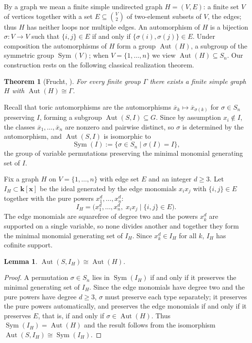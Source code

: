 \documentclass[11pt,letterpaper,reqno]{amsart}
\newtheorem{theorem}{Theorem}[section]
\newtheorem{lemma}[lemma]{Lemma}
\theoremstyle{remark}
\theoremstyle{definition}
\def\XX{\mathbf{x}}
\newcommand{\KK}[0]{\ensuremath{\mathbf{k}}}
\newcommand{\Aut}[0]{\ensuremath{\operatorname{Aut}}}
\newcommand{\Sym}[0]{\ensuremath{\operatorname{Sym}}}
\begin{document}
By a graph we mean a finite simple undirected graph $H=(V,E)$: a finite
set $V$ of vertices together with a set $E\subseteq\binom{V}{2}$ of
two-element subsets of $V$, the edges; thus $H$ has neither loops nor
multiple edges. An automorphism of $H$ is a bijection $\sigma\colon V\to
V$ such that $\{i,j\}\in E$ if and only if $\{\sigma(i),\sigma(j)\}\in E$. Under
composition the automorphisms of $H$ form a group $\Aut(H)$, a subgroup of the
symmetric group $\Sym(V)$; when $V=\{1,\dots,n\}$ we view $\Aut(H)\subseteq S_n$.
Our construction rests on the following classical realization theorem.

\begin{theorem}[Frucht, {\cite[Sections~2--3]{Frucht1939}}]\label{thm:frucht}
For every finite group $\Gamma$ there exists a finite simple graph $H$ with
$\Aut(H)\cong\Gamma$.
\end{theorem}


Recall that toric automorphisms are the
automorphisms $\overline{x}_k\mapsto\overline{x}_{\sigma(k)}$ for $\sigma\in S_n$
preserving $I$, forming a subgroup $\Aut(S,I)\subseteq G$. Since by assumption $x_i\not\in I$, the classes $\overline{x}_1,\dots,\overline{x}_n$ are nonzero and pairwise distinct, so $\sigma$ is determined by the automorphism, and $\Aut(S,I)$ is isomorphic to
$$\Sym(I):=\{\sigma\in S_n\mid\sigma(I)=I\},$$
the group of variable permutations preserving the minimal monomial generating set of $I$.

Fix a graph $H$ on $V=\{1,\dots,n\}$ with edge set $E$ and an integer
$d\geq 3$. Let $I_H\subset\KK[\XX]$ be the ideal generated by the
edge monomials $x_ix_j$ with $\{i,j\}\in E$ together with the pure powers
$x_1^d,\dots,x_n^d$:
\begin{equation}\label{eq:IH}
I_H=\big(x_1^d,\dots,x_n^d,\;x_ix_j\mid\{i,j\}\in E\big).
\end{equation}
The edge monomials are squarefree of degree two and the powers
$x_k^d$ are supported on a single variable, so none divides another and
together they form the minimal monomial generating set of $I_H$. Since $x_k^d\in I_H$ for all $k$, $I_H$
has cofinite support.

\begin{lemma}\label{lem:frucht-ideal}
$\Aut(S,I_H)\cong\Aut(H)$.
\end{lemma}

\begin{proof}
A permutation $\sigma\in S_n$ lies in $\Sym(I_H)$ if and only if it preserves
the minimal generating set of $I_H$. Since the edge monomials have degree two
and the pure powers have degree $d\geq 3$, $\sigma$ must preserve each type
separately; it preserves the pure powers automatically, and preserves the edge
monomials if and only if it preserves $E$, that is, if and only if
$\sigma\in\Aut(H)$. Thus $\Sym(I_H)=\Aut(H)$ and the result follows from the
isomorphism $\Aut(S,I_H)\cong\Sym(I_H)$.
\end{proof}
\end{document}
